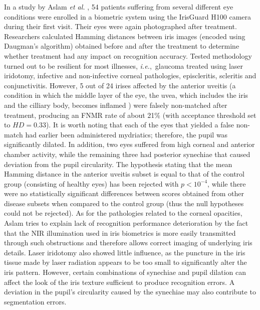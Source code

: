 \documentclass[article,12pt]{elsarticle}
\newcommand{\ie}{{\it i.e.},~}
\begin{document}
In a study by Aslam \emph{et al.} \cite{Aslam}, 54 patients suffering from several different eye conditions were enrolled in a biometric system using the IrisGuard H100 camera during their first visit. Their eyes were again photographed after treatment. Researchers calculated Hamming distances between iris images (encoded using Daugman’s algorithm) obtained before and after the treatment to determine whether treatment had any impact on recognition accuracy. Tested methodology turned out to be resilient for most illnesses, \ie glaucoma treated using laser iridotomy, infective and non-infective corneal pathologies, episcleritis, scleritis and conjunctivitis. However, 5 out of 24 irises affected by the anterior uveitis (a condition in which the middle layer of the eye, the uvea, which includes the iris and the cilliary body, becomes inflamed \cite{Uveitis}) were falsely non-matched after treatment, producing an FNMR rate of about 21\% (with acceptance threshold set to $HD=0.33$). It is worth noting that each of the eyes that yielded a false non-match had earlier been administered mydriatics; therefore, the pupil was significantly dilated. In addition, two eyes suffered from high corneal and anterior chamber activity, while the remaining three had posterior synechiae that caused deviation from the pupil circularity.  The hypothesis stating that the mean Hamming distance in the anterior uveitis subset is equal to that of the control group (consisting of healthy eyes) has been rejected with $p < 10^{-4}$, while there were no statistically significant differences between scores obtained from other disease subsets when compared to the control group (thus the null hypotheses could not be rejected). As for the pathologies related to the corneal opacities, Aslam tries to explain lack of recognition performance deterioration by the fact that the NIR illumination used in iris biometrics is more easily transmitted through such obstructions and therefore allows correct imaging of underlying iris details. Laser iridotomy also showed little influence, as the puncture in the iris tissue made by laser radiation appears to be too small to significantly alter the iris pattern. However, certain combinations of synechiae and pupil dilation can affect the look of the iris texture sufficient to produce recognition errors. A deviation in the pupil’s circularity caused by the synechiae may also contribute to segmentation errors.
\end{document}
